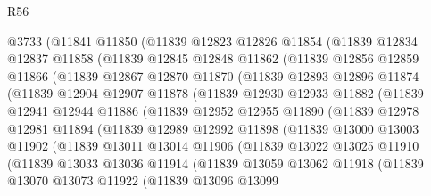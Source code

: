 \begin{lexlean}{R56}
\begin{coremodule}
    @3733
      (@11841
        @11850
        (@11839
          @12823
          @12826
          @11854
          (@11839
            @12834
            @12837
            @11858
            (@11839
              @12845
              @12848
              @11862
              (@11839
                @12856
                @12859
                @11866
                (@11839
                  @12867
                  @12870
                  @11870
                  (@11839
                    @12893
                    @12896
                    @11874
                    (@11839
                      @12904
                      @12907
                      @11878
                      (@11839
                        @12930
                        @12933
                        @11882
                        (@11839
                          @12941
                          @12944
                          @11886
                          (@11839
                            @12952
                            @12955
                            @11890
                            (@11839
                              @12978
                              @12981
                              @11894
                              (@11839
                                @12989
                                @12992
                                @11898
                                (@11839
                                  @13000
                                  @13003
                                  @11902
                                  (@11839
                                    @13011
                                    @13014
                                    @11906
                                    (@11839
                                      @13022
                                      @13025
                                      @11910
                                      (@11839
                                        @13033
                                        @13036
                                        @11914
                                        (@11839
                                          @13059
                                          @13062
                                          @11918
                                          (@11839
                                            @13070
                                            @13073
                                            @11922
                                            (@11839
                                              @13096
                                              @13099

\end{coremodule}
\end{lexlean}

